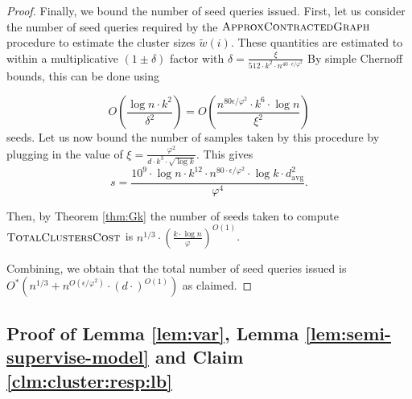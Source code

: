 \documentclass[letterpaper,11pt]{article}
\theoremstyle{plain}
\theoremstyle{definition}
\theoremstyle{remark}
\newcommand{\e}{\epsilon}
\begin{document}
\begin{proof}
Finally, we bound the number of seed queries issued. First, let us
	consider the number of seed queries required by the $\textsc{ApproxContractedGraph}$ procedure to estimate the cluster sizes $\widetilde{w}(i)$.  These quantities are estimated to within a multiplicative $(1 \pm \delta)$ factor
	with $\delta = \frac{\xi}{512\cdot k^2\cdot n^{40\cdot \epsilon/\varphi^2}}$
	By simple Chernoff bounds, this can be done using  

	$$O\left( \frac{\log n \cdot k^2}{\delta^2} \right) = O\left( \frac{n^{80 \e/\varphi^2} \cdot k^{6}  \cdot \log n}{\xi^2} \right)$$ seeds. 
    Let us now bound the number of samples taken by this procedure by plugging in the value of $\xi = \frac{\varphi^2}{d \cdot  k^3 \cdot \sqrt{\log k}}$. This gives 
 $$s  = \frac{10^9\cdot \log n\cdot k^{12} \cdot n^{80\cdot \epsilon/\varphi^2} \cdot \log k \cdot d_{\text{avg}}^2}{\varphi^4}.$$  

 
    Then, by Theorem \ref{thm:Gk} the number of seeds taken to compute $\textsc{TotalClustersCost}$ is $n^{1/3}\cdot \left(\frac{k\cdot \log n}{\varphi}\right)^{O(1)}$.
    
    Combining, we obtain that the total number of seed queries issued is $O^*\left(n^{1/3}+ n^{O(\e/\varphi^2)}\cdot (d \cdot )^{O(1)}\right)$ as claimed. 
\end{proof}

 \subsection{Proof of Lemma \ref{lem:var}, Lemma \ref{lem:semi-supervise-model} and Claim \ref{clm:cluster:resp:lb}} \label{sec:hoeffding:proof}
\lemhoeffding*
\end{document}
